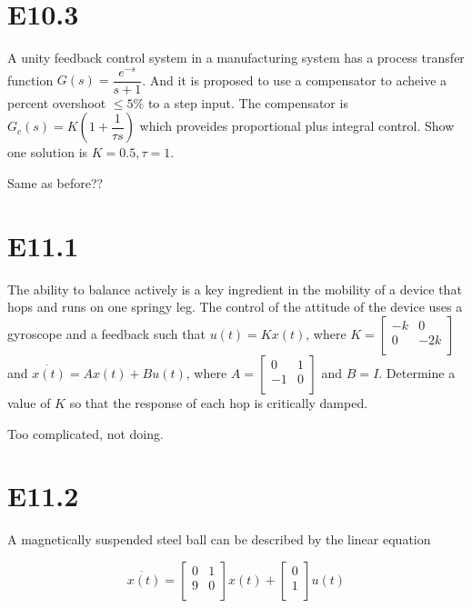 \documentclass[11pt]{article}
\begin{document}
\section{E10.3}

A unity feedback control system in a manufacturing system has a process transfer function $G(s) = \dfrac{e^{-s}}{s + 1}$. And it is proposed to use a compensator to acheive a percent overshoot $\leq 5\%$ to a step input. The compensator is $G_c(s) = K \left(1 + \dfrac{1}{\tau s} \right)$ which proveides proportional plus integral control. Show one solution is $K = 0.5, \tau = 1$.

Same as before??

\section{E11.1}

The ability to balance actively is a key ingredient in the mobility of a device that hops and runs on one springy leg. The control of the attitude of the device uses a gyroscope and a feedback such that $u(t) = Kx(t)$, where $K = \begin{bmatrix} -k & 0 \\ 0 & -2k \\ \end{bmatrix}$ and $\dot{x(t)} = A x(t) + B u(t)$, where $A = \begin{bmatrix} 0 & 1 \\ -1 & 0 \\ \end{bmatrix}$ and $B = I$. Determine a value of $K$ so that the response of each hop is critically damped.

Too complicated, not doing.

\section{E11.2}

A magnetically suspended steel ball can be described by the linear equation 

\[ \dot{x(t)} = \begin{bmatrix} 0 & 1 \\ 9 & 0 \\ \end{bmatrix} x(t) + \begin{bmatrix} 0 \\ 1 \\ \end{bmatrix} u(t) \]
\end{document}
